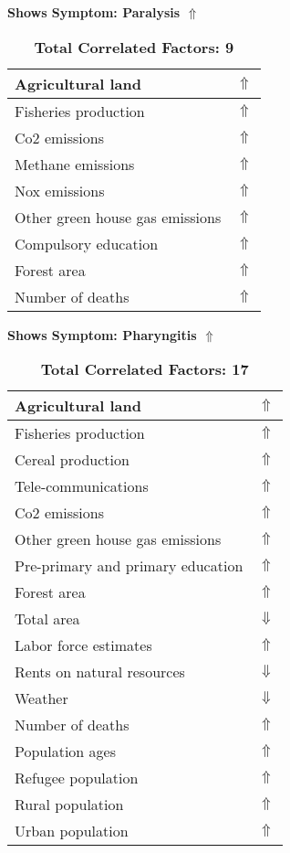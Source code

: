 \documentclass[12pt,notitlepage,oneside]{report}
\begin{document}
\begin{table}[!htb]
\caption{\textbf{Shows Symptom: Paralysis $\Uparrow$}}
\centering
\label{Correlated Socio-economic Factors0}
\begin{tabular}{|l|l|}
\hline
Agricultural land & $\Uparrow$\\ \hline
Fisheries production & $\Uparrow$\\ \hline
Co2 emissions & $\Uparrow$\\ \hline
Methane emissions & $\Uparrow$\\ \hline
Nox emissions & $\Uparrow$\\ \hline
Other green house gas emissions & $\Uparrow$\\ \hline
Compulsory education & $\Uparrow$\\ \hline
Forest area & $\Uparrow$\\ \hline
Number of deaths & $\Uparrow$\\ \hline
\end{tabular}
\caption*{\textbf{Total Correlated Factors: 9}}
\end{table}
\begin{table}[!htb]
\caption{\textbf{Shows Symptom: Pharyngitis $\Uparrow$}}
\centering
\label{Correlated Socio-economic Factors0}
\begin{tabular}{|l|l|}
\hline
Agricultural land & $\Uparrow$\\ \hline
Fisheries production & $\Uparrow$\\ \hline
Cereal production & $\Uparrow$\\ \hline
Tele-communications & $\Uparrow$\\ \hline
Co2 emissions & $\Uparrow$\\ \hline
Other green house gas emissions & $\Uparrow$\\ \hline
Pre-primary and primary education & $\Uparrow$\\ \hline
Forest area & $\Uparrow$\\ \hline
Total area & $\Downarrow$\\ \hline
Labor force estimates & $\Uparrow$\\ \hline
Rents on natural resources & $\Downarrow$\\ \hline
Weather & $\Downarrow$\\ \hline
Number of deaths & $\Uparrow$\\ \hline
Population ages & $\Uparrow$\\ \hline
Refugee population & $\Uparrow$\\ \hline
Rural population & $\Uparrow$\\ \hline
Urban population & $\Uparrow$\\ \hline
\end{tabular}
\caption*{\textbf{Total Correlated Factors: 17}}
\end{table}
\end{document}

